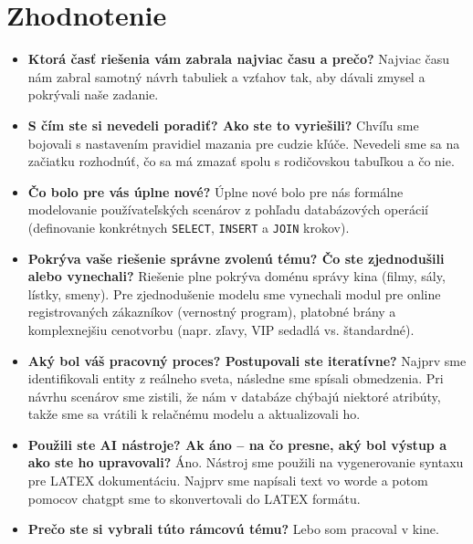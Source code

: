 \documentclass[11pt, a4paper]{article}
\begin{document}
\newpage
\section{Zhodnotenie}
\label{sec:zhodnotenie}

\begin{itemize}
    \item \textbf{Ktorá časť riešenia vám zabrala najviac času a prečo?}
    Najviac času nám zabral samotný návrh tabuliek a vzťahov tak, aby dávali zmysel a pokrývali naše zadanie.

    \item \textbf{S čím ste si nevedeli poradiť? Ako ste to vyriešili?}
    Chvíľu sme bojovali s nastavením pravidiel mazania pre cudzie kľúče. Nevedeli sme sa na začiatku rozhodnúť, čo sa má zmazať spolu s rodičovskou tabuľkou a čo nie.

    \item \textbf{Čo bolo pre vás úplne nové?}
    Úplne nové bolo pre nás formálne modelovanie používateľských scenárov z pohľadu databázových operácií (definovanie konkrétnych \texttt{SELECT}, \texttt{INSERT} a \texttt{JOIN} krokov).

    \item \textbf{Pokrýva vaše riešenie správne zvolenú tému? Čo ste zjednodušili alebo vynechali?}
    Riešenie plne pokrýva doménu správy kina (filmy, sály, lístky, smeny). Pre zjednodušenie modelu sme vynechali modul pre online registrovaných zákazníkov (vernostný program), platobné brány a komplexnejšiu cenotvorbu (napr. zľavy, VIP sedadlá vs. štandardné).

    \item \textbf{Aký bol váš pracovný proces? Postupovali ste iteratívne?}
    Najprv sme identifikovali entity z reálneho sveta, následne sme spísali obmedzenia. Pri návrhu scenárov sme zistili, že nám v databáze chýbajú niektoré atribúty, takže sme sa vrátili k relačnému modelu a aktualizovali ho.

    \item \textbf{Použili ste AI nástroje? Ak áno – na čo presne, aký bol výstup a ako ste ho upravovali?}
    Áno. Nástroj sme použili na vygenerovanie syntaxu pre LATEX dokumentáciu. Najprv sme napísali text vo worde a potom pomocov chatgpt sme to skonvertovali do LATEX formátu.

    \item \textbf{Prečo ste si vybrali túto rámcovú tému?}
    Lebo som pracoval v kine.
\end{itemize}

\printbibliography
\end{document}
